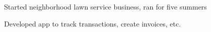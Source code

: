\documentclass[]{deedy-resume-openfont}
\begin{document}
\begin{minipage}[t]{0.66\textwidth}
\begin{tightemize}
\item Started neighborhood lawn service business, ran for five summers
\item Developed  app to track transactions, create invoices, etc.
\end{tightemize}
\sectionsep



 


\end{minipage}
\end{document}
